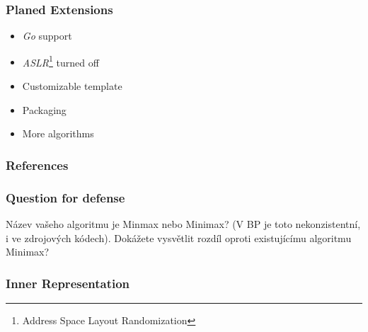 \documentclass[10pt,xcolor=pdflatex]{beamer}
\begin{document}
\begin{frame}\frametitle{Planed Extensions}
  \begin{itemize}
    \item \emph{Go} support
    \item \emph{ASLR}\footnote{Address Space Layout Randomization} turned off
    \item Customizable template
    \item Packaging
    \item More algorithms
  \end{itemize}
\end{frame}

\begin{frame}[allowframebreaks]
	\frametitle{References}
	\printbibliography
\end{frame}


\appendix

\begin{frame}\frametitle{Question for defense}
    Název vašeho algoritmu je Minmax nebo Minimax? (V BP je toto nekonzistentní, i ve zdrojových kódech). Dokážete vysvětlit rozdíl oproti existujícímu algoritmu Minimax?
\end{frame}

\begin{frame}\frametitle{Inner Representation}
  \begin{figure}[h]
  \centering
  \label{fig:tikz:IDStree}
\end{figure}
\end{frame}
\end{document}

